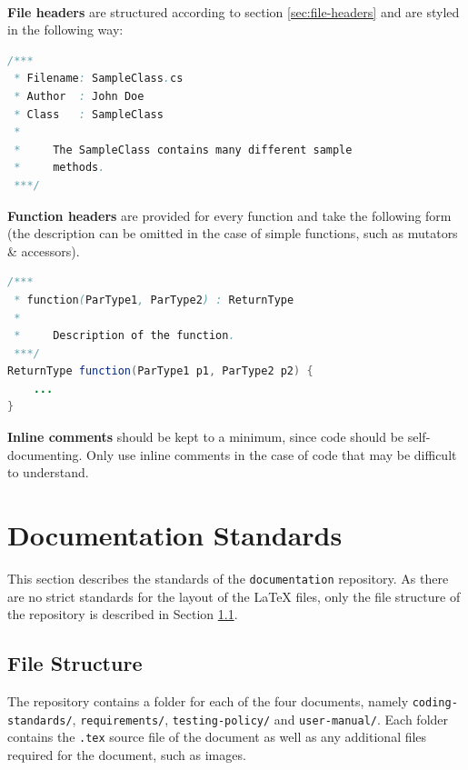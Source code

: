 \documentclass{article}
\begin{document}
    \paragraph{}
    \textbf{File headers} are structured according to section
    \ref{sec:file-headers} and are styled in the following way:

    \begin{lstlisting}[language=Java]
/***
 * Filename: SampleClass.cs
 * Author  : John Doe
 * Class   : SampleClass
 *
 *     The SampleClass contains many different sample
 *     methods.
 ***/
    \end{lstlisting}

    \textbf{Function headers} are provided for every function and take the
    following form (the description can be omitted in the case of simple
    functions, such as mutators \& accessors).

    \begin{lstlisting}[language=Java]
/***
 * function(ParType1, ParType2) : ReturnType
 *
 *     Description of the function.
 ***/
ReturnType function(ParType1 p1, ParType2 p2) {
    ...
}
    \end{lstlisting}

    \textbf{Inline comments} should be kept to a minimum, since code should be
    self-documenting. Only use inline comments in the case of code that may be
    difficult to understand.

    \newpage


    \section{Documentation Standards}
    \label{sec:documentation}

    This section describes the standards of the \texttt{documentation}
    repository. As there are no strict standards for the layout of the \LaTeX
    files, only the file structure of the repository is described in Section
    \ref{sec:doc-struc}.

    \subsection{File Structure}
    \label{sec:doc-struc}

    The repository contains a folder for each of the four documents, namely
    \texttt{coding-standards/}, \texttt{requirements/}, \texttt{testing-policy/}
    and \texttt{user-manual/}. Each folder contains the \texttt{.tex} source
    file of the document as well as any additional files required for the
    document, such as images.
\end{document}
